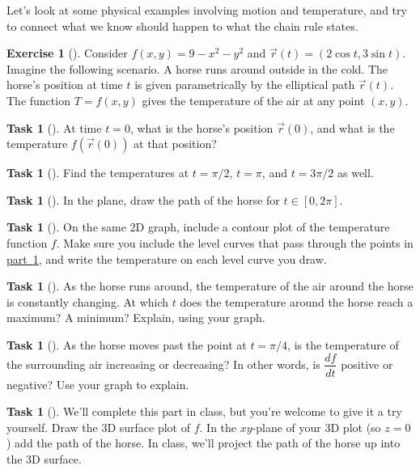 \documentclass[10pt,]{book}
\theoremstyle{plain}
\theoremstyle{definition}
\theoremstyle{definition}
\theoremstyle{definition}
\theoremstyle{definition}
\newtheorem{exploration}[project]{Exercise}
\newtheorem{task}[project]{Task}
\theoremstyle{definition}
\numberwithin{equation}{section}
\begin{document}
Let's look at some physical examples involving motion and temperature, and try to connect what we know should happen to what the chain rule states.%
\begin{exploration}[]\label{prob_horse_track_chain}
Consider \(f(x,y)=9-x^2-y^2\) and \(\vec r(t)=(2\cos t, 3\sin t)\). Imagine the following scenario. A horse runs around outside in the cold. The horse's position at time \(t\) is given parametrically by the elliptical path \(\vec r(t)\). The function \(T=f(x,y)\) gives the temperature of the air at any point \((x,y)\).%
\begin{task}[]\label{item_1}
At time \(t=0\), what is the horse's position \(\vec r(0)\), and what is the temperature \(f(\vec r(0))\) at that position?%
\end{task}
\begin{task}[]\label{task-342}
Find the temperatures at \(t=\pi/2\), \(t=\pi\), and \(t=3\pi/2\) as well.%
\end{task}
\begin{task}[]\label{task-343}
In the plane, draw the path of the horse for \(t\in [0,2\pi]\).%
\end{task}
\begin{task}[]\label{task-344}
On the same 2D graph, include a contour plot of the temperature function \(f\). Make sure you include the level curves that pass through the points in \hyperref[item_1]{part~\ref{item_1}}, and write the temperature on each level curve you draw. %
\end{task}
\begin{task}[]\label{task-345}
As the horse runs around, the temperature of the air around the horse is constantly changing. At which \(t\) does the temperature around the horse reach a maximum?  A minimum?  Explain, using your graph. %
\end{task}
\begin{task}[]\label{item_2}
As the horse moves past the point at \(t=\pi/4\), is the temperature of the surrounding air increasing or decreasing? In other words, is \(\dfrac{df}{dt}\) positive or negative? Use your graph to explain.%
\end{task}
\begin{task}[]\label{task-347}
We'll complete this part in class, but you're welcome to give it a try yourself. Draw the 3D surface plot of \(f\). In the \(xy\)-plane of your 3D plot (so \(z=0\)) add the path of the horse. In class, we'll project the path of the horse up into the 3D surface.%
\end{task}
\end{exploration}
\end{document}
